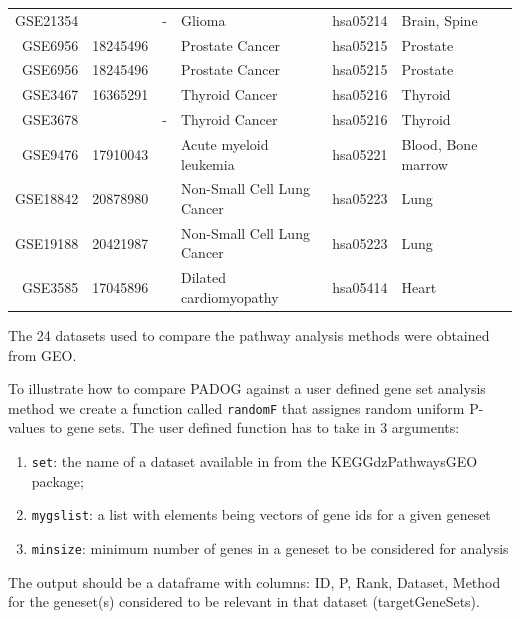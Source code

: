 \documentclass[11pt]{article}
\begin{document}
\begin{table}
\begin{tabular}{rllllll}
GSE21354&&-&Glioma&hsa05214 &Brain, Spine\\
GSE6956&18245496&\cite{pmid18245496}&Prostate Cancer& hsa05215 &Prostate\\
GSE6956&18245496&\cite{pmid18245496}& Prostate Cancer& hsa05215&Prostate\\
GSE3467&16365291&\cite{pmid16365291}& Thyroid Cancer& hsa05216&Thyroid\\
GSE3678&&-&Thyroid Cancer&hsa05216& Thyroid \\
GSE9476&17910043&\cite{pmid17910043}& Acute myeloid leukemia&hsa05221&Blood, Bone marrow \\
GSE18842&20878980&\cite{pmid20878980}& Non-Small Cell Lung Cancer&hsa05223&Lung \\
GSE19188&20421987&\cite{pmid20421987}& Non-Small Cell Lung Cancer&hsa05223&Lung \\
GSE3585&17045896&\cite{pmid17045896}& Dilated cardiomyopathy&hsa05414 &Heart\\
   \hline
\end{tabular}

\begin{flushleft} The 24 datasets used to compare the pathway analysis methods were obtained from GEO.
\end{flushleft}
\label{tab:datasets}
\end{table}

To illustrate how to compare PADOG against a user defined gene set analysis method we create a function called 
{\tt randomF} that assignes random uniform P-values to gene sets. The user defined function has to take in 3 arguments:
\begin{enumerate}
\item {\tt set}: the name of a dataset available in from the KEGGdzPathwaysGEO package;
\item {\tt mygslist}: a list with elements being vectors of gene ids for a given geneset
\item {\tt minsize}: minimum number of genes in a geneset to be considered for analysis
\end{enumerate}
 
The output should be a dataframe with columns: ID, P, Rank, Dataset, Method for the geneset(s) considered to be relevant 
in that dataset (targetGeneSets).  
\end{document}
